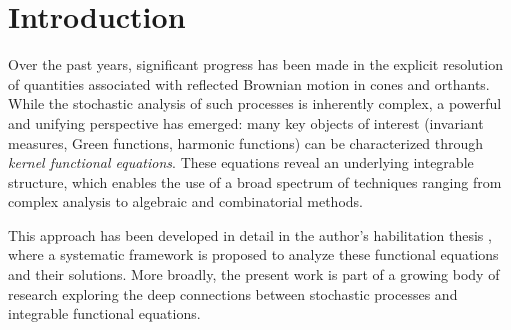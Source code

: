 \documentclass[11pt]{article}
\theoremstyle{definition}
\begin{document}
\tableofcontents


%
%
%

\newpage
\section{Introduction}

Over the past years, significant progress has been made in the explicit resolution of quantities associated with reflected Brownian motion in cones and orthants. While the stochastic analysis of such processes is inherently complex, a powerful and unifying perspective has emerged: many key objects of interest (invariant measures, Green functions, harmonic functions) can be characterized through \emph{kernel functional equations}. These equations reveal an underlying integrable structure, which enables the use of a broad spectrum of techniques ranging from complex analysis to algebraic and combinatorial methods.

This approach has been developed in detail in the author’s habilitation thesis \cite{HDR}, where a systematic framework is proposed to analyze these functional equations and their solutions. More broadly, the present work is part of a growing body of research exploring the deep connections between stochastic processes and integrable functional equations.
\end{document}
